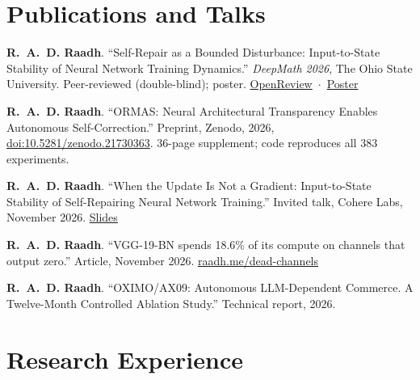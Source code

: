 \documentclass[10pt,a4paper]{article}
\begin{document}
\section*{Publications and Talks}
\begin{pubs}
  \item \textbf{R.~A.~D. Raadh}. ``Self-Repair as a Bounded Disturbance: Input-to-State Stability of Neural Network Training Dynamics.'' \textit{DeepMath 2026}, The Ohio State University. Peer-reviewed (double-blind); poster. \mbox{\href{https://openreview.net/forum?id=kowltBZEIv}{OpenReview} $\cdot$ \href{https://www.raadh.me/deepmath}{Poster}}
  \item \textbf{R.~A.~D. Raadh}. ``ORMAS: Neural Architectural Transparency Enables Autonomous Self-Correction.'' Preprint, Zenodo, 2026, \href{https://doi.org/10.5281/zenodo.21730363}{doi:10.5281/zenodo.21730363}. 36-page supplement; code reproduces all 383 experiments.
  \item \textbf{R.~A.~D. Raadh}. ``When the Update Is Not a Gradient: Input-to-State Stability of Self-Repairing Neural Network Training.'' Invited talk, Cohere Labs, November 2026. \href{https://www.raadh.me/assets/pdf/Raadh_CohereLabs_2026_When_the_Update_Is_Not_a_Gradient.pdf}{Slides}
  \item \textbf{R.~A.~D. Raadh}. ``VGG-19-BN spends 18.6\% of its compute on channels that output zero.'' Article, November 2026. \href{https://www.raadh.me/dead-channels}{raadh.me/dead-channels}
  \item \textbf{R.~A.~D. Raadh}. ``OXIMO/AX09: Autonomous LLM-Dependent Commerce. A Twelve-Month Controlled Ablation Study.'' Technical report, 2026.
\end{pubs}

\section*{Research Experience}
\end{document}
